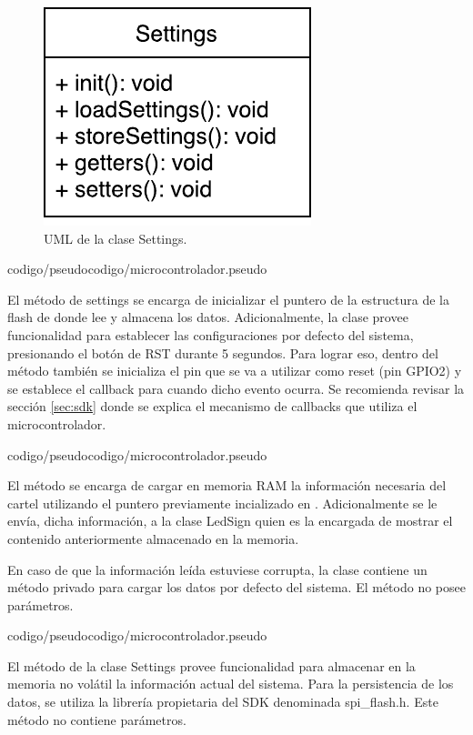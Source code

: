 \begin{figure}[!ht]
	\centering
	\includegraphics[scale=0.8]{imagenes/uml/settings.pdf}
	\caption{UML de la clase Settings.}
	\label{uml:settings}
\end{figure}

 {codigo/pseudocodigo/microcontrolador.pseudo}

El método  de settings se encarga de inicializar el puntero de la estructura de la flash de donde lee y almacena los datos.
Adicionalmente, la clase provee funcionalidad para establecer las configuraciones por defecto del sistema, presionando el botón de RST durante 5 segundos.
Para lograr eso, dentro del método  también se inicializa el pin que se va a utilizar como reset (pin GPIO2) y se establece el callback para cuando dicho evento ocurra.
Se recomienda revisar la sección \ref{sec:sdk} donde se explica el mecanismo de callbacks que utiliza el microcontrolador.

 {codigo/pseudocodigo/microcontrolador.pseudo}

El método  se encarga de cargar en memoria RAM la información necesaria del cartel utilizando el puntero previamente incializado en .
Adicionalmente se le envía, dicha información, a la clase LedSign quien es la encargada de mostrar el contenido anteriormente almacenado en la memoria.

En caso de que la información leída estuviese corrupta, la clase contiene un método privado para cargar los datos por defecto del sistema.
El método no posee parámetros.

 {codigo/pseudocodigo/microcontrolador.pseudo}

El método  de la clase Settings provee funcionalidad para almacenar en la memoria no volátil la información actual del sistema.
Para la persistencia de los datos, se utiliza la librería propietaria del SDK denominada spi\_flash.h.
Este método no contiene parámetros.


